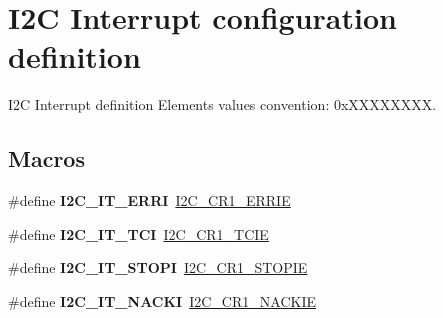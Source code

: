 \hypertarget{group___i2_c___interrupt__configuration__definition}{}\section{I2C Interrupt configuration definition}
\label{group___i2_c___interrupt__configuration__definition}


I2C Interrupt definition Elements values convention\+: 0x\+X\+X\+X\+X\+X\+X\+XX.  


\subsection*{Macros}
\begin{DoxyCompactItemize}
\item 
\mbox{\label{group___i2_c___interrupt__configuration__definition_gaef52e00037d5a51adf3f3a97aefcbdda}} 
\#define {\bfseries I2\+C\+\_\+\+I\+T\+\_\+\+E\+R\+RI}~\mbox{\hyperlink{group___peripheral___registers___bits___definition_ga75e971012a02f9dad47a1629c6f5d956}{I2\+C\+\_\+\+C\+R1\+\_\+\+E\+R\+R\+IE}}
\item 
\mbox{\label{group___i2_c___interrupt__configuration__definition_ga6e848112accf2d034e979e65710b2f0f}} 
\#define {\bfseries I2\+C\+\_\+\+I\+T\+\_\+\+T\+CI}~\mbox{\hyperlink{group___peripheral___registers___bits___definition_ga6b37e64bdf6399ef12c3df77bcb1634f}{I2\+C\+\_\+\+C\+R1\+\_\+\+T\+C\+IE}}
\item 
\mbox{\label{group___i2_c___interrupt__configuration__definition_ga0a85b2740a7d8669dfeacdc81ef0692b}} 
\#define {\bfseries I2\+C\+\_\+\+I\+T\+\_\+\+S\+T\+O\+PI}~\mbox{\hyperlink{group___peripheral___registers___bits___definition_ga1f1576cb1a2cd847f55fe2a0820bb166}{I2\+C\+\_\+\+C\+R1\+\_\+\+S\+T\+O\+P\+IE}}
\item 
\mbox{\label{group___i2_c___interrupt__configuration__definition_gaf64fb93453bfbae36de26ff1465029f0}} 
\#define {\bfseries I2\+C\+\_\+\+I\+T\+\_\+\+N\+A\+C\+KI}~\mbox{\hyperlink{group___peripheral___registers___bits___definition_gae3f71f7a55e13a467b2a5ed639e0fe18}{I2\+C\+\_\+\+C\+R1\+\_\+\+N\+A\+C\+K\+IE}}

\end{DoxyCompactItemize}
